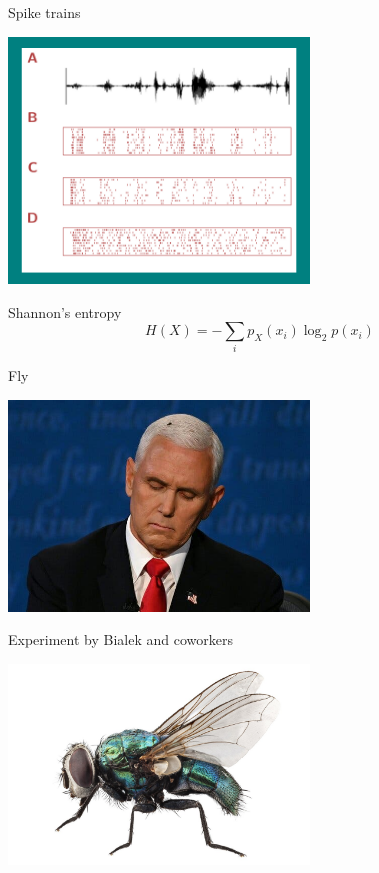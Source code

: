 \documentclass{beamer}
\begin{document}
\begin{frame}{Spike trains}
\color{reddish}
\begin{center}
\includegraphics[width=8cm]{SpikeTrains.png}
\end{center}
\end{frame}

\begin{frame}{Shannon's entropy}
\color{reddish}
$$
H(X)=-\sum_i p_X(x_i)\log_2{p(x_i)}
$$
\color{black}
\end{frame}

\begin{frame}{Fly}
  \begin{center}
    \includegraphics[width=8cm]{pence_fly.jpg}
  \end{center}
\end{frame}

\begin{frame}{Experiment by Bialek and coworkers}
  \begin{center}
    \includegraphics[width=8cm]{Blow-Fly.jpg}
  \end{center}
\end{frame}
  
\end{document}

